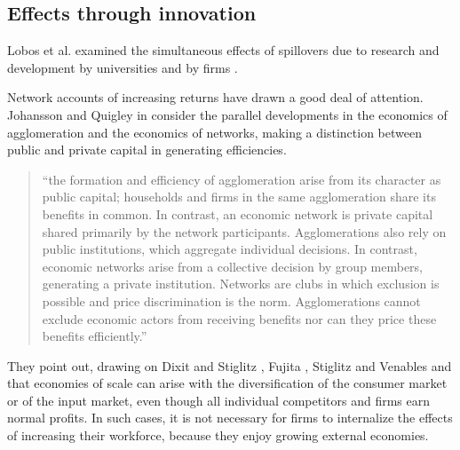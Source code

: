          


\subsection{Effects through innovation}



Lobos et al. examined the simultaneous effects of spillovers due to research and development by universities and by firms \cite{belderbosWhatSpilloversUniversities2022}.


Network accounts of increasing returns have drawn a good deal of attention.
Johansson and Quigley \cite{johanssonAgglomerationNetworksSpatial} in \cite{floraxFiftyYearsRegional2004} consider the parallel developments in the economics of agglomeration and the economics of networks, making a distinction between public and private capital in generating efficiencies.

\begin{quotation}
``the formation and efficiency of agglomeration arise from its character as public capital; households and firms in the same agglomeration share its benefits in common. In contrast, an economic network is private capital shared primarily by the network participants. Agglomerations also rely on public institutions, which aggregate individual decisions. In contrast, economic networks arise from a collective decision by group members, generating a private institution. Networks are clubs in which exclusion is possible and price discrimination is the norm. Agglomerations cannot exclude economic actors from receiving benefits nor can they price these benefits efficiently.''
\end{quotation}
They point out, drawing on Dixit and Stiglitz \cite{AvinashK.Dixit1977MCaO},  Fujita \cite{fujitaMonopolisticCompetitionModel1988}, Stiglitz and Venables and \cite{fujitaSpatialEconomyCities1999} that economies of scale  can arise with the diversification of the consumer market or of the input market, even though all individual competitors and firms earn normal profits. In such cases, it is not necessary for firms to internalize the effects of increasing their workforce, because they enjoy growing external economies.

